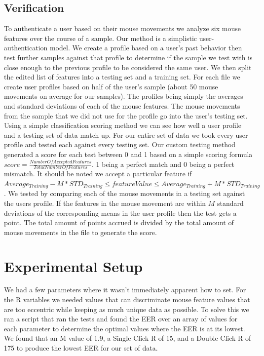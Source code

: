 \documentclass[conference]{IEEEtran}
\begin{document}
\subsection{Verification}
	To authenticate a user based on their mouse movements we analyze six mouse features over the course of a sample. Our method is a simplistic user-authentication model. We create a profile based on a user's past behavior then test further samples against that profile to determine if the sample we test with is close enough to the previous profile to be considered the same user.  
We then split the edited list of features into a testing set and a training set. For each file we create user profiles based on half of the user's sample (about 50 mouse movements on average for our samples). The profiles being simply the averages and standard deviations of each of the mouse features. The mouse movements from the sample that we did not use for the profile go into the user's testing set.
Using a simple classification scoring method we can see how well a user profile and a testing set of data match up. For our entire set of data we took every user profile and tested each against every testing set. Our custom testing method generated a score for each test between 0 and 1 based on a simple scoring formula \( score = \frac{Number Of Accepted Features}{Total Number Of Features} \). 1 being a perfect match and 0 being a perfect mismatch. It should be noted we accept a particular feature if \(Average_{Training} - M * STD_{Training} \leq featureValue \leq Average_{Training} + M * STD_{Training} \).
We tested by comparing each of the mouse movements in a testing set against the users profile. If the features in the mouse movement are within $M$ standard deviations of the corresponding means in the user profile then the test gets a point. The total amount of points accrued is divided by the total amount of mouse movements in the file to generate the score.
	


\section{Experimental Setup}
We had a few parameters where it wasn’t immediately apparent how to set. For the R variables we needed values that can discriminate mouse feature values that are too eccentric while keeping as much unique data as possible. To solve this we ran a script that ran the tests and found the EER over an array of values for each parameter to determine the optimal values where the EER is at its lowest. We found that an M value of 1.9, a Single Click R of 15, and a Double Click R of 175 to produce the lowest EER for our set of data.
\end{document}
